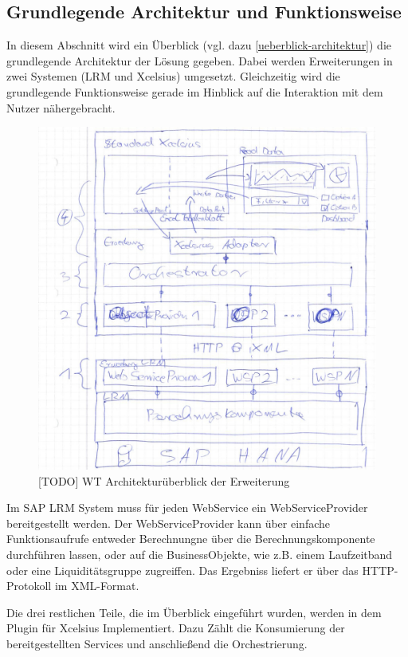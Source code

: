 \subsection{Grundlegende Architektur und Funktionsweise}
In diesem Abschnitt wird ein Überblick (vgl. dazu \vref{ueberblick-architektur}) die grundlegende Architektur der Lösung gegeben. Dabei werden Erweiterungen in zwei Systemen (LRM und Xcelsius) umgesetzt. Gleichzeitig wird die grundlegende Funktionsweise gerade im Hinblick auf die Interaktion mit dem Nutzer nähergebracht.

\begin{figure}[h]
\centering
\setlength{\unitlength}{1mm}
\includegraphics[width=15cm]{images/Ueberblick-Architektur.jpg}
\caption{[TODO] WT Architekturüberblick der Erweiterung\label{fig:ueberblick-architektur}}
\end{figure}

Im SAP LRM System muss für jeden WebService ein WebServiceProvider bereitgestellt werden. Der WebServiceProvider kann über einfache Funktionsaufrufe entweder Berechnungne über die Berechnungskomponente durchführen lassen, oder auf die BusinessObjekte, wie z.B. einem Laufzeitband oder eine Liquiditätsgruppe zugreiffen. Das Ergebniss liefert er über das HTTP-Protokoll im XML-Format.

Die drei restlichen Teile, die im Überblick eingeführt wurden, werden in dem Plugin für Xcelsius Implementiert. Dazu Zählt die Konsumierung der bereitgestellten Services und anschließend die Orchestrierung.

